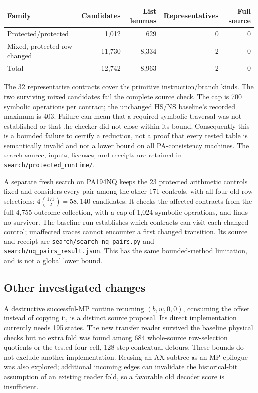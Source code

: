 \documentclass[10pt,letterpaper]{article}
\newcommand{\file}[1]{\nolinkurl{#1}}
\begin{document}
\begin{center}
\begin{tabular}{lrrrr}
\toprule
Family & Candidates & List lemmas & Representatives & Full source\\\midrule
Protected/protected & 1,012 & 629 & 0 & 0\\
Mixed, protected row changed & 11,730 & 8,334 & 2 & 0\\\midrule
Total & 12,742 & 8,963 & 2 & 0\\\bottomrule
\end{tabular}
\end{center}

The 32 representative contracts cover the primitive instruction/branch
kinds. The two surviving mixed candidates fail the complete source check.
The cap is 700 symbolic operations per contract; the unchanged HS/NS
baseline's recorded maximum is 403. Failure can mean that a required
symbolic traversal was not established or that the checker did not close
within its bound. Consequently this is a bounded failure to certify a
reduction, not a proof that every tested table is semantically invalid and
not a lower bound on all PA-consistency machines. The search source,
inputs, licenses, and receipts are retained in \file{search/protected_runtime/}.

A separate fresh search on PA194NQ keeps the 23 protected arithmetic
controls fixed and considers every pair among the other 171 controls,
with all four old-row selections: \(4\binom{171}{2}=58{,}140\) candidates.
It checks the affected contracts from the full 4,755-outcome collection,
with a cap of 1,024 symbolic operations, and finds no survivor. The
baseline run establishes which contracts can visit each changed control;
unaffected traces cannot encounter a first changed transition. Its source
and receipt are \file{search/search_nq_pairs.py} and
\file{search/nq_pairs_result.json}. This has the same bounded-method
limitation, and is not a global lower bound.

\subsection{Other investigated changes}

A destructive successful-MP routine returning \((b,w,0,0)\), consuming
the offset instead of copying it, is a distinct source proposal. Its
direct implementation currently needs 195 states. The new transfer
reader survived the baseline physical checks but no extra fold was found
among 684 whole-source row-selection quotients or the tested four-cell,
128-step contextual detours. These bounds do not exclude another
implementation. Reusing an AX subtree as an MP epilogue was also explored;
additional incoming edges can invalidate the historical-bit assumption of
an existing reader fold, so a favorable old decoder score is insufficient.
\end{document}
